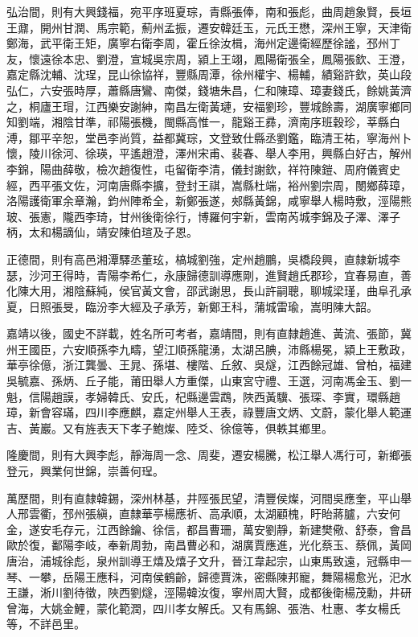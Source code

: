 \begin{pinyinscope}
弘治間，則有大興錢福，宛平序班夏琮，青縣張俸，南和張彪，曲周趙象賢，長垣王鼐，開州甘潤、馬宗範，薊州孟振，遷安韓廷玉，元氏王懋，深州王寧，天津衛鄭海，武平衛王矩，廣寧右衛李周，霍丘徐汝楫，海州定邊衛經歷徐謐，邳州丁友，懷遠徐本忠、劉澄，宣城吳宗周，潁上王翊，鳳陽衛張全，鳳陽張欽、王澄，嘉定縣沈輔、沈珵，昆山徐協祥，豐縣周潭，徐州權宇、楊輔，績谿許欽，英山段弘仁，六安張時厚，蕭縣唐鸞、南傑，錢塘朱昌，仁和陳璋、璋妻錢氏，餘姚黃濟之，桐廬王瑁，江西樂安謝紳，南昌左衛黃璉，安福劉珍，豐城餘壽，湖廣寧鄉同知劉端，湘陰甘準，祁陽張機，閩縣高惟一，龍谿王彞，濟南序班穀珍，莘縣白溥，鄒平辛恕，堂邑李尚質，益都冀琮，文登致仕縣丞劉鑑，臨清王祐，寧海州卜懷，陵川徐河、徐瑛，平遙趙澄，澤州宋甫、裴春、舉人李用，興縣白好古，解州李錦，陽曲薛敬，檢次趙復性，屯留衛李清，儀封謝欽，祥符陳鎧、周府儀賓史經，西平張文佐，河南唐縣李擴，登封王祺，嵩縣杜端，裕州劉宗周，閿鄉薛璋，洛陽護衛軍余章瀚，鈞州陣希全，新鄭張遂，郟縣黃錦，咸寧舉人楊時敷，涇陽熊玻、張憲，隴西李琦，甘州後衛徐行，博羅何宇新，雲南芮城李錦及子澤、澤子柄，太和楊謫仙，靖安陳伯瑄及子恩。

正德間，則有高邑湘潭驛丞董玹，槁城劉強，定州趙鵬，吳橋段興，直隸新城李瑟，沙河王得時，青陽李希仁，永康歸德訓導應剛，進賢趙氏郡珍，宜春易直，善化陳大用，湘陰蘇純，侯官黃文會，邵武謝思，長山許嗣聰，聊城梁瑾，曲阜孔承夏，日照張旻，臨汾李大經及子承芳，新鄭王科，蒲城雷瑜，嵩明陳大韶。

嘉靖以後，國史不詳載，姓名所可考者，嘉靖間，則有直隸趙進、黃流、張節，冀州王國臣，六安順孫李九疇，望江順孫龍湧，太湖呂腆，沛縣楊冕，潁上王敷政，華亭徐億，浙江龔曇、王晁、孫堪、樓階、丘敘、吳燧，江西餘冠雄、曾柏，福建吳毓嘉、孫炳、丘子能，莆田舉人方重傑，山東宮守禮、王選，河南馮金玉、劉一魁，信陽趙謨，孝婦韓氏、安氏，杞縣邊雲鵡，陜西黃驥、張琛、李實，環縣趙璋，新會容璊，四川李應麒，嘉定州舉人王表，祿豐唐文炳、文蔚，蒙化舉人範運吉、黃巖。又有旌表天下孝子鮑燦、陸爻、徐億等，俱軼其鄉里。

隆慶間，則有大興李彪，靜海周一念、周斐，遷安楊騰，松江舉人馮行可，新鄉張登元，興業何世錦，崇善何珵。

萬歷間，則有直隸韓錫，深州林基，井陘張民望，清豐侯燦，河間吳應奎，平山舉人邢雲衢，邳州張縝，直隸華亭楊應祈、高承順，太湖顧槐，盱眙蔣臚，六安何金，遂安毛存元，江西餘鑰、徐信，都昌曹珊，萬安劉靜，新建樊儆、舒泰，會昌歐於復，鄱陽李岐，奉新周勃，南昌曹必和，湖廣賈應進，光化蔡玉、蔡佩，黃岡唐治，浦城徐彪，泉州訓導王熺及熺子文升，晉江韋起宗，山東馬致遠，冠縣申一琴、一攀，岳陽王應科，河南侯鶴齡，歸德賈洙，密縣陳邦寵，舞陽楊愈光，汜水王謙，淅川劉待徵，陜西劉燧，涇陽韓汝復，寧州周大賢，成都後衛楊茂勳，井研曾海，大姚金鯉，蒙化範潤，四川孝女解氏。又有馬錦、張浩、杜惠、孝女楊氏等，不詳邑里。


\end{pinyinscope}
